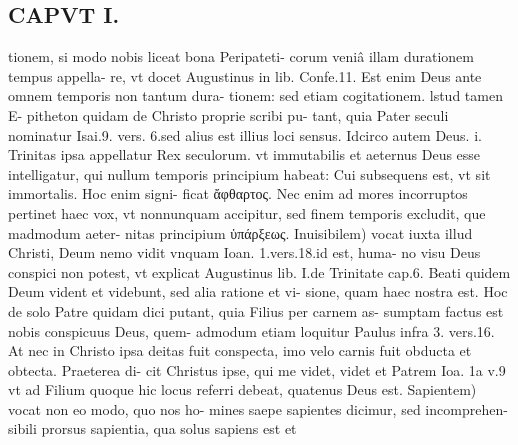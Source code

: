 \documentclass{article}
\begin{document}
\begin{pages}
\section*{CAPVT  I. }
\marginpar{[ p.31 ]}\pstart tionem, si modo nobis liceat bona Peripateti- corum veniâ illam durationem tempus appella- re, vt docet Augustinus in lib.  Confe.11. Est enim Deus ante omnem temporis non tantum dura- tionem: sed etiam cogitationem. lstud tamen E- pitheton quidam de Christo proprie scribi pu- tant, quia Pater seculi nominatur Isai.9. vers. 6.sed alius est illius loci sensus. Idcirco autem Deus. i. Trinitas ipsa appellatur Rex seculorum. vt immutabilis et aeternus Deus esse intelligatur, qui nullum temporis principium habeat: Cui subsequens est, vt sit immortalis. Hoc enim signi- ficat ἄφθαρτος. Nec enim ad mores incorruptos pertinet haec vox, vt nonnunquam accipitur, sed finem temporis excludit, que madmodum aeter- nitas principium ὑπάρξεως. Inuisibilem) vocat iuxta illud Christi, Deum nemo vidit vnquam Ioan. 1.vers.18.id est, huma- no visu Deus conspici non potest, vt explicat Augustinus lib.  I.de Trinitate cap.6. Beati quidem Deum vident et videbunt, sed alia ratione et vi- sione, quam haec nostra est. Hoc de solo Patre quidam dici putant, quia Filius per carnem as- sumptam factus est nobis conspicuus Deus, quem- admodum etiam loquitur Paulus infra 3. vers.16. At nec in Christo ipsa deitas fuit conspecta, imo velo carnis fuit obducta et obtecta. Praeterea di- cit Christus ipse, qui me videt, videt et Patrem Ioa. 1a v.9 vt ad Filium quoque hic locus referri debeat, quatenus Deus est. Sapientem) vocat non eo modo, quo nos ho- mines saepe sapientes dicimur, sed incomprehen- sibili prorsus sapientia, qua solus sapiens est et  \pend

\end{pages}
\end{document}
